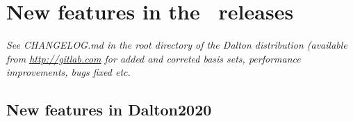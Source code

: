 \chapter{New features in the \dalton\ releases}


{\it See {\rm CHANGELOG.md} in the root directory of the Dalton distribution (available from {\rm \url{http://gitlab.com}} for 
added and correted basis sets, performance improvements, bugs fixed etc. }

\section{New features in Dalton2020}

